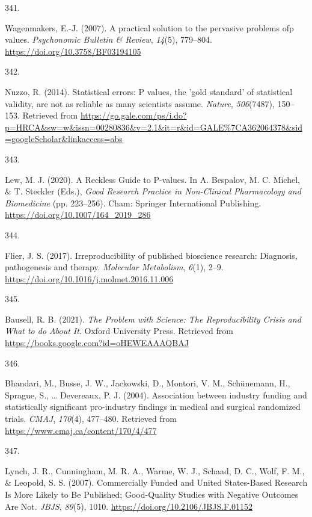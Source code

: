 \documentclass[
  11pt,
  letterpaper,
]{scrreprt}
\newlength{\cslhangindent}
\newlength{\csllabelwidth}
\newenvironment{CSLReferences}[2] %
 {\begin{list}{}{%
  \setlength{\itemindent}{0pt}
  \setlength{\leftmargin}{0pt}
  \setlength{\parsep}{0pt}
  \ifodd #1
   \setlength{\leftmargin}{\cslhangindent}
   \setlength{\itemindent}{-1\cslhangindent}
  \fi
  \setlength{\itemsep}{#2\baselineskip}}}
 {\end{list}}
\newcommand{\CSLLeftMargin}[1]{\parbox[t]{\csllabelwidth}{\strut#1\strut}}
\newcommand{\CSLRightInline}[1]{\parbox[t]{\linewidth - \csllabelwidth}{\strut#1\strut}}
\begin{document}
\begin{CSLReferences}{0}{0}
\CSLLeftMargin{341. }%
\CSLRightInline{Wagenmakers, E.-J. (2007). A practical solution to the
pervasive problems ofp values. \emph{Psychonomic Bulletin \& Review},
\emph{14}(5), 779--804. \url{https://doi.org/10.3758/BF03194105}}

\CSLLeftMargin{342. }%
\CSLRightInline{Nuzzo, R. (2014). Statistical errors: {P} values, the
'gold standard' of statistical validity, are not as reliable as many
scientists assume. \emph{Nature}, \emph{506}(7487), 150--153. Retrieved
from
\url{https://go.gale.com/ps/i.do?p=HRCA&sw=w&issn=00280836&v=2.1&it=r&id=GALE\%7CA362064378&sid=googleScholar&linkaccess=abs}}

\CSLLeftMargin{343. }%
\CSLRightInline{Lew, M. J. (2020). A {Reckless Guide} to {P-values}. In
A. Bespalov, M. C. Michel, \& T. Steckler (Eds.), \emph{Good {Research
Practice} in {Non-Clinical Pharmacology} and {Biomedicine}} (pp.
223--256). Cham: Springer International Publishing.
\url{https://doi.org/10.1007/164_2019_286}}

\CSLLeftMargin{344. }%
\CSLRightInline{Flier, J. S. (2017). Irreproducibility of published
bioscience research: {Diagnosis}, pathogenesis and therapy.
\emph{Molecular Metabolism}, \emph{6}(1), 2--9.
\url{https://doi.org/10.1016/j.molmet.2016.11.006}}

\CSLLeftMargin{345. }%
\CSLRightInline{Bausell, R. B. (2021). \emph{The {Problem} with
{Science}: {The Reproducibility Crisis} and {What} to do {About It}}.
Oxford University Press. Retrieved from
\url{https://books.google.com?id=oHEWEAAAQBAJ}}

\CSLLeftMargin{346. }%
\CSLRightInline{Bhandari, M., Busse, J. W., Jackowski, D., Montori, V.
M., Schünemann, H., Sprague, S., \ldots{} Devereaux, P. J. (2004).
Association between industry funding and statistically significant
pro-industry findings in medical and surgical randomized trials.
\emph{CMAJ}, \emph{170}(4), 477--480. Retrieved from
\url{https://www.cmaj.ca/content/170/4/477}}

\CSLLeftMargin{347. }%
\CSLRightInline{Lynch, J. R., Cunningham, M. R. A., Warme, W. J.,
Schaad, D. C., Wolf, F. M., \& Leopold, S. S. (2007). Commercially
{Funded} and {United States-Based Research Is More Likely} to {Be
Published}; {Good-Quality Studies} with {Negative Outcomes Are Not}.
\emph{JBJS}, \emph{89}(5), 1010.
\url{https://doi.org/10.2106/JBJS.F.01152}}


\end{CSLReferences}
\end{document}
